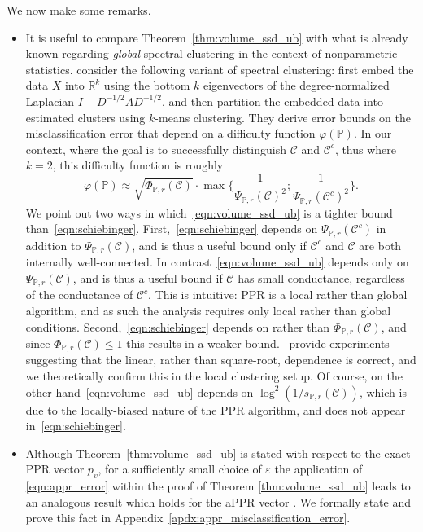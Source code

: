 \documentclass[twoside,11pt]{article}
\newcommand{\Reals}{\mathbb{R}}
\newcommand{\1}{\mathbf{1}}
\newcommand{\mc}[1]{\mathcal{#1}}
\newcommand{\Pbb}{\mathbb{P}}
\newcommand{\wh}[1]{\widehat{#1}}
\begin{document}
We now make some remarks.
\begin{itemize}
	\item It is useful to compare Theorem~\ref{thm:volume_ssd_ub} with what is already known regarding \emph{global} spectral clustering in the context of nonparametric statistics. \cite{schiebinger2015} consider the following variant of spectral clustering: first embed the data $X$ into $\Reals^k$ using the bottom $k$ eigenvectors of the degree-normalized Laplacian $I - D^{-1/2}AD^{-1/2}$, and then partition the embedded data into estimated clusters \smash{$\wh{C}_1,\ldots,\wh{C}_k$} using $k$-means clustering. They derive error bounds on the misclassification error that depend on a difficulty function $\varphi(\Pbb)$. In our context, where the goal is to successfully distinguish $\mc{C}$ and $\mc{C}^c$, thus where $k = 2$, this difficulty function is roughly
	\begin{equation}
	\label{eqn:schiebinger}
	\varphi(\Pbb) \approx \sqrt{\Phi_{\Pbb,r}(\mc{C})} \cdot \max\biggl\{ \frac{1}{\Psi_{\Pbb,r}(\mc{C})^2}; \frac{1}{\Psi_{\Pbb,r}(\mc{C}^c)^2}\biggr\}.
	\end{equation}
	We point out two ways in which~\eqref{eqn:volume_ssd_ub} is a tighter bound than~\eqref{eqn:schiebinger}. First,~\eqref{eqn:schiebinger} depends on $\Psi_{\Pbb,r}(\mc{C}^c)$ in addition to $\Psi_{\Pbb,r}(\mc{C})$, and is thus a useful bound only if $\mc{C}^c$ and $\mc{C}$ are both internally well-connected. In contrast~\eqref{eqn:volume_ssd_ub} depends only on $\Psi_{\Pbb,r}(\mc{C})$, and is thus a useful bound if $\mc{C}$ has small conductance, regardless of the conductance of $\mc{C}^c$. This is intuitive: PPR is a local rather than global algorithm, and as such the analysis requires only local rather than global conditions. Second,~\eqref{eqn:schiebinger} depends on \smash{$\sqrt{\Phi_{\Pbb,r}(\mc{C})}$} rather than $\Phi_{\Pbb,r}(\mc{C})$, and since $\Phi_{\Pbb,r}(\mc{C}) \leq 1$ this results in a weaker bound.~\citet{schiebinger2015} provide experiments suggesting that the linear, rather than square-root, dependence is correct, and we theoretically confirm this in the local clustering setup. Of course, on the other hand~\eqref{eqn:volume_ssd_ub} depends on $\log^2(1/s_{\Pbb,r}(\mc{C}))$, which is due to the locally-biased nature of the PPR algorithm, and does not appear in~\eqref{eqn:schiebinger}.
	
	\item Although Theorem~\ref{thm:volume_ssd_ub} is stated with respect to the exact PPR vector $p_v$, for a sufficiently small choice of $\varepsilon$ the 
	application of \eqref{eqn:appr_error} within the proof of Theorem
	\ref{thm:volume_ssd_ub} leads to an analogous result which holds for the aPPR vector . We formally state and prove this fact in Appendix~\ref{apdx:appr_misclassification_error}.
\end{itemize}
\end{document}
